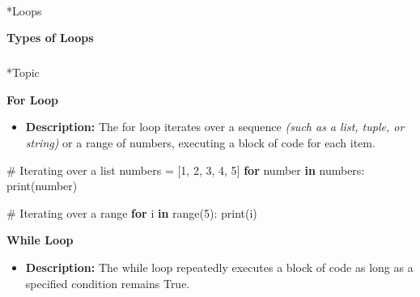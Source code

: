 \documentclass[
  letterpaper,
  DIV=11,
  numbers=noendperiod]{scrreprt}
\makeatletter
\let\oldparagraph\paragraph
\renewcommand{\paragraph}{
    \@ifstar
      \xxxParagraphStar
      \xxxParagraphNoStar
  }
\newcommand{\xxxParagraphStar}[1]{\oldparagraph*{#1}\mbox{}}
\newcommand{\xxxParagraphNoStar}[1]{\oldparagraph{#1}\mbox{}}
\let\oldsubparagraph\subparagraph
\renewcommand{\subparagraph}{
    \@ifstar
      \xxxSubParagraphStar
      \xxxSubParagraphNoStar
  }
\newcommand{\xxxSubParagraphStar}[1]{\oldsubparagraph*{#1}\mbox{}}
\newcommand{\xxxSubParagraphNoStar}[1]{\oldsubparagraph{#1}\mbox{}}
\newenvironment{Shaded}{\begin{snugshade}}{\end{snugshade}}
\newcommand{\BuiltInTok}[1]{\textcolor[rgb]{0.00,0.23,0.31}{#1}}
\newcommand{\CommentTok}[1]{\textcolor[rgb]{0.37,0.37,0.37}{#1}}
\newcommand{\ControlFlowTok}[1]{\textcolor[rgb]{0.00,0.23,0.31}{\textbf{#1}}}
\newcommand{\DecValTok}[1]{\textcolor[rgb]{0.68,0.00,0.00}{#1}}
\newcommand{\KeywordTok}[1]{\textcolor[rgb]{0.00,0.23,0.31}{\textbf{#1}}}
\newcommand{\NormalTok}[1]{\textcolor[rgb]{0.00,0.23,0.31}{#1}}
\newcommand{\OperatorTok}[1]{\textcolor[rgb]{0.37,0.37,0.37}{#1}}
\providecommand{\tightlist}{%
  \setlength{\itemsep}{0pt}\setlength{\parskip}{0pt}}
\makeatother
\begin{document}
\begin{tcolorbox}[enhanced jigsaw, colframe=quarto-callout-note-color-frame, toprule=.15mm, bottomrule=.15mm, rightrule=.15mm, colback=white, breakable, arc=.35mm, opacityback=0, left=2mm, leftrule=.75mm]
\end{tcolorbox}

\paragraph*{Loops}\label{loops}

\begin{tcolorbox}[enhanced jigsaw, colframe=quarto-callout-note-color-frame, toprule=.15mm, bottomrule=.15mm, rightrule=.15mm, colback=white, breakable, arc=.35mm, opacityback=0, left=2mm, leftrule=.75mm]

\vspace{-3mm}\textbf{Types of Loops}\vspace{3mm}

\subparagraph*{Topic}\label{topic}

\textbf{For Loop}

\begin{itemize}
\tightlist
\item
  \textbf{Description:} The for loop iterates over a sequence
  \emph{(such as a list, tuple, or string)} or a range of numbers,
  executing a block of code for each item.
\end{itemize}

\begin{Shaded}
\begin{Highlighting}[]
\CommentTok{\# Iterating over a list}
\NormalTok{numbers }\OperatorTok{=}\NormalTok{ [}\DecValTok{1}\NormalTok{, }\DecValTok{2}\NormalTok{, }\DecValTok{3}\NormalTok{, }\DecValTok{4}\NormalTok{, }\DecValTok{5}\NormalTok{]}
\ControlFlowTok{for}\NormalTok{ number }\KeywordTok{in}\NormalTok{ numbers:}
    \BuiltInTok{print}\NormalTok{(number)}

\CommentTok{\# Iterating over a range}
\ControlFlowTok{for}\NormalTok{ i }\KeywordTok{in} \BuiltInTok{range}\NormalTok{(}\DecValTok{5}\NormalTok{):}
    \BuiltInTok{print}\NormalTok{(i)}
\end{Highlighting}
\end{Shaded}

\textbf{While Loop}

\begin{itemize}
\tightlist
\item
  \textbf{Description:} The while loop repeatedly executes a block of
  code as long as a specified condition remains True.
\end{itemize}


\end{tcolorbox}
\end{document}
